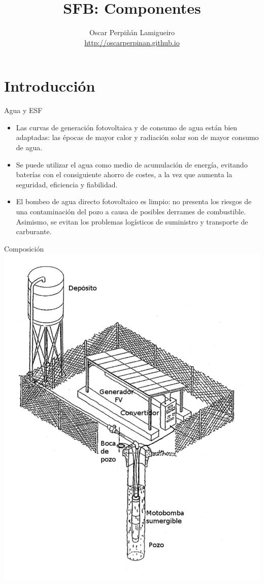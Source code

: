 \documentclass[xcolor={usenames,svgnames,dvipsnames}]{beamer}
\author{Oscar Perpiñán Lamigueiro \\ \url{http://oscarperpinan.github.io}}
\date{}
\title{SFB: Componentes}
\begin{document}
\maketitle

\section{Introducción}
\label{sec-1}

\begin{frame}[label=sec-1-0-1]{Agua y ESF}
\begin{itemize}
\item Las \alert{curvas de generación fotovoltaica y de consumo de agua están bien adaptadas}: las épocas de mayor calor y radiación solar son de mayor consumo de agua.

\item Se puede utilizar el \alert{agua como medio de acumulación de energía}, evitando baterías con el consiguiente ahorro de costes, a la vez que aumenta la seguridad, eficiencia y fiabilidad.

\item El bombeo de agua directo fotovoltaico es limpio: \alert{no presenta los riesgos de una contaminación del pozo a causa de posibles derrames de combustible}. Asimismo, se evitan los problemas logísticos de suministro y transporte de carburante.
\end{itemize}
\end{frame}


\begin{frame}[label=sec-1-0-2]{Composición}
\includegraphics[height=\textheight]{../figs/EsquemaBombeo_oscar.pdf}
\end{frame}
\end{document}
